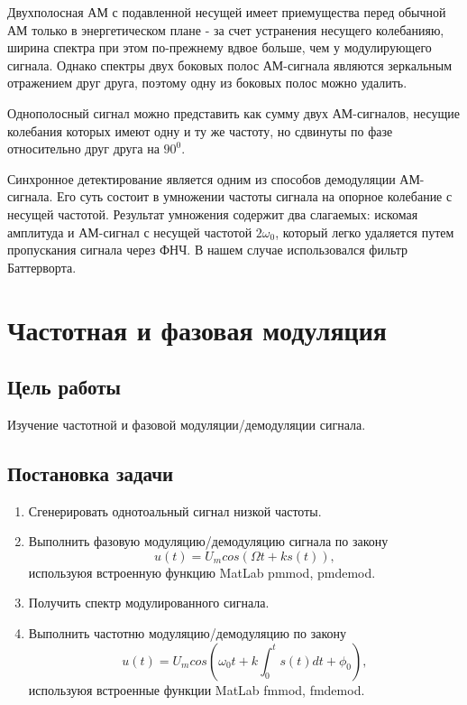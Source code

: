 \documentclass[10pt,a4paper]{article}
\begin{document}
Двухполосная АМ с подавленной несущей имеет приемущества перед обычной АМ только в энергетическом плане - за счет устранения несущего колебанияю, ширина спектра при этом по-прежнему вдвое больше, чем у модулирующего сигнала. Однако спектры двух боковых полос АМ-сигнала являются зеркальным отражением друг друга, поэтому одну из боковых полос можно удалить.

Однополосный сигнал можно представить как сумму двух АМ-сигналов, несущие колебания которых имеют одну и ту же частоту, но сдвинуты по фазе относительно друг друга на $90^0$.

Синхронное детектирование является одним из способов демодуляции АМ-сигнала. Его суть состоит в умножении частоты сигнала на опорное колебание с несущей частотой. Результат умножения содержит два слагаемых: искомая амплитуда и АМ-сигнал с несущей частотой $2\omega_0$, который легко удаляется путем пропускания сигнала через ФНЧ. В нашем случае использовался фильтр Баттерворта.

\newpage
\section{Частотная и фазовая модуляция}

\subsection{Цель работы}
Изучение частотной и фазовой модуляции/демодуляции сигнала.

\subsection{Постановка задачи}
	\begin{enumerate}
		\item Сгенерировать однотоальный сигнал низкой частоты.
		\item Выполнить фазовую модуляцию/демодуляцию сигнала по закону
				\begin{equation}
					u(t) = U_m cos(\Omega t + ks(t)),
				\end{equation}
		используюя встроенную функцию MatLab pmmod, pmdemod.
		\item Получить спектр модулированного сигнала.
		\item Выполнить частотню модуляцию/демодуляцию по закону
				\begin{equation}
					u(t) = U_m cos(\omega_0 t + k \int_0^t s(t) dt + \phi_0),
				\end{equation}
		используюя встроенные функции MatLab fmmod, fmdemod.
	\end{enumerate}
\end{document}
